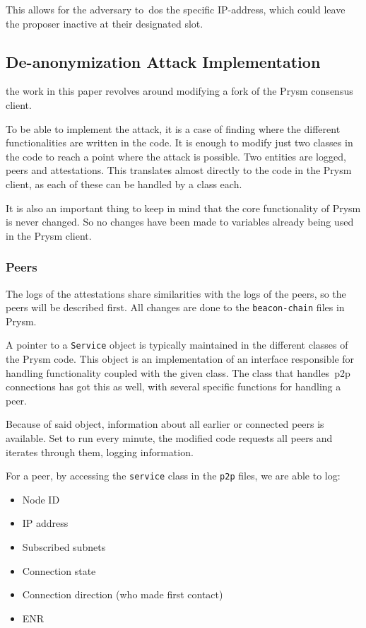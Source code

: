 This allows for the adversary to~\gls{dos} the specific IP-address,
which could leave the proposer inactive at their designated slot.

\subsection{De-anonymization Attack Implementation}\label{subsec:attack-implementation}
the work in this paper revolves around modifying a fork of the Prysm consensus client.

To be able to implement the attack,
it is a case of finding where the different functionalities are written in the code.
It is enough to modify just two classes in the code to reach a point where the attack is possible.
Two entities are logged, peers and attestations.
This translates almost directly to the code in the Prysm client, as each of these can be handled by a class each.

It is also an important thing to keep in mind that the core functionality of Prysm is never changed.
So no changes have been made to variables already being used in the Prysm client.




\subsubsection{Peers}\label{subsubsec:peers}
The logs of the attestations share similarities with the logs of the peers, so the peers will be described first.
All changes are done to the \texttt{beacon-chain} files in Prysm.

A pointer to a \texttt{Service} object is typically maintained in the different classes of the Prysm code.
This object is an implementation of an interface responsible for handling functionality coupled with the given class.
The class that handles~\gls{p2p} connections has got this as well, with several specific functions for handling a peer.

Because of said object, information about all earlier or connected peers is available.
Set to run every minute, the modified code requests all peers and iterates through them,
logging information.

For a peer, by accessing the \texttt{service} class in the \texttt{p2p} files, we are able to log:
\begin{itemize}
     \item Node ID
     \item IP address
     \item Subscribed subnets
     \item Connection state
     \item Connection direction (who made first contact)
     \item ENR
\end{itemize}


